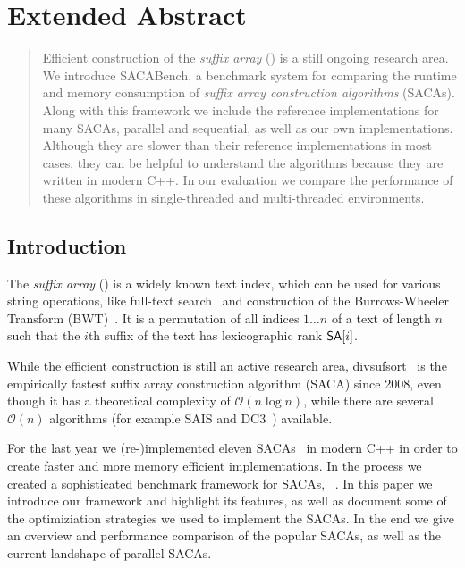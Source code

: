 \chapter{Extended Abstract}


{
\newtheorem*{abstract}{Abstract}

\begin{abstract}
    Efficient construction of the \emph{suffix array} (\sa) is a still ongoing research area.
    We introduce SACABench, a benchmark system for comparing the runtime
    and memory consumption of \emph{suffix array construction algorithms} (SACAs).
    Along with this framework we include the reference implementations for many SACAs,
    parallel and sequential, as well as our own implementations.
    Although they are slower than their reference implementations in most cases,
    they can be helpful to understand the algorithms because they are written in modern C++.
    In our evaluation we compare the performance of these algorithms
    in single-threaded and multi-threaded environments.
\end{abstract}
}

\section{Introduction}

The  \emph{suffix array} (\emph{\sa}) is a widely known text index,
which can be used for various string operations,
like full-text search~\cite{makinen} and construction of the Burrows-Wheeler Transform (BWT)~\cite{BWT}.
It is a permutation of all indices $1 \dots n$ of a text of length $n$ such
that the $i$th suffix of the text  has lexicographic rank $\sa[i]$.

While the efficient construction is still an active research area,
divsufsort~\cite{saca:5,saca:5:repo} is the empirically fastest
suffix array construction algorithm (SACA) since 2008,
even though it has a theoretical complexity of $\mathcal O (n \log n)$,
while there are several $\mathcal O(n)$ algorithms (for example SAIS\cite{saca:6} and DC3~\cite{saca:9}) available.

For the last year we (re-)implemented eleven SACAs~\cite{saca:3,saca:11,saca:5,saca:9,saca:1,saca:8,saca:4,saca:7,saca:10,saca:6,saca:2}
in modern C++ in order to create faster and more memory efficient implementations.
In the process we created a sophisticated benchmark framework for SACAs, \emph{\sacabench}~\cite{sacabench:github}.
In this paper we introduce our framework and highlight its features,
as well as document some of the optimiziation strategies we used to implement the SACAs.
In the end we give an overview and performance comparison of the popular SACAs,
as well as the current landshape of parallel SACAs.

